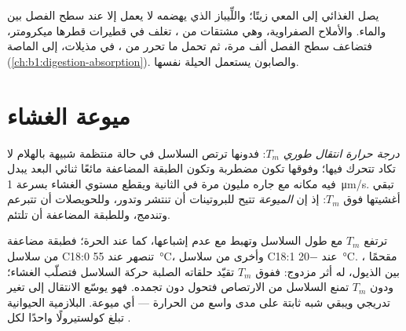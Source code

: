 \begin{example}\label{ex:b1:lipids:bile}
يصل  الغذائي إلى المعي زيتًا؛ واللِّيباز الذي يهضمه لا يعمل إلا
عند سطح الفصل بين  والماء. والأملاح الصفراوية، وهي مشتقات
 من ، تغلف  في قطيرات قطرها ميكرومتر،
فتضاعف سطح الفصل ألف مرة، ثم تحمل ما تحرر من ، في مذيلات،
إلى  الماصة (\cref{ch:b1:digestion-absorption}). والصابون
يستعمل الحيلة نفسها.
\end{example}

\section{ميوعة الغشاء}

\begin{definition}\label{def:b1:lipids:fluidity}
 \emph{درجة حرارة انتقال طوري}
$T_m$: فدونها ترتص السلاسل في حالة منتظمة شبيهة بالهلام لا تكاد
 تتحرك فيها؛ وفوقها تكون مضطربة وتكون الطبقة المضاعفة مائعًا
ثنائي البعد يبدل فيه  مكانه مع جاره مليون مرة في الثانية ويقطع
مستوي الغشاء بسرعة \qty{1}{\micro m/s}.  تبقي أغشيتها فوق
$T_m$: إذ إن \emph{الميوعة} تتيح للبروتينات أن تنتشر
وتدور، وللحويصلات أن تتبرعم وتندمج، وللطبقة المضاعفة أن تلتئم.
\end{definition}

\begin{proposition}\label{prop:b1:lipids:fluidityfactors}
ترتفع $T_m$ مع طول السلاسل وتهبط مع عدم إشباعها، كما عند  الحرة؛ فطبقة مضاعفة من سلاسل C18:0 تنصهر عند
\qty{55}{\celsius}، وأخرى من سلاسل C18:1 عند \qty{-20}{\celsius}.
، مقحمًا بين الذيول، له أثر مزدوج: ففوق $T_m$ تقيّد
حلقاته الصلبة حركة السلاسل فتصلّب الغشاء؛ ودون $T_m$ تمنع السلاسل من
الارتصاص فتحول دون تجمده. فهو يوسّع الانتقال إلى تغير تدريجي ويبقي
 شبه ثابتة على مدى واسع من الحرارة --- أي  ميوعة.
 البلازمية الحيوانية تبلغ كولستيرولًا واحدًا لكل
.
\end{proposition}


